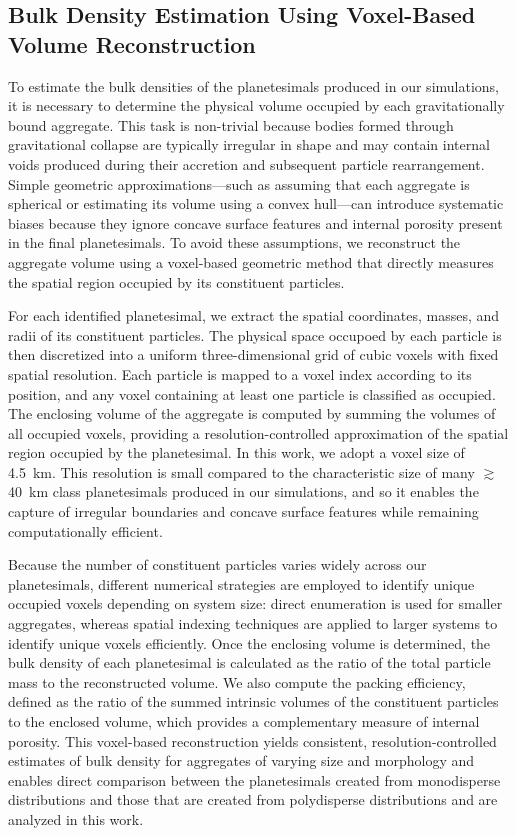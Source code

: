 \documentclass[fleqn,usenatbib]{mnras}
\begin{document}
\subsection{Bulk Density Estimation Using Voxel-Based Volume Reconstruction}\label{sec:bulk_density}
To estimate the bulk densities of the planetesimals produced in our simulations, it is necessary to determine the physical volume occupied by each gravitationally bound aggregate.
This task is non-trivial because bodies formed through gravitational collapse are typically irregular in shape and may contain internal voids produced during their accretion and subsequent particle rearrangement. 
Simple geometric approximations---such as assuming that each aggregate is spherical or estimating its volume using a convex hull---can introduce systematic biases because they ignore concave surface features and internal porosity present in the final planetesimals.
To avoid these assumptions, we reconstruct the aggregate volume using a voxel-based geometric method that directly measures the spatial region occupied by its constituent particles.

For each identified planetesimal, we extract the spatial coordinates, masses, and radii of its constituent particles.
The physical space occupoed by each particle is then discretized into a uniform three-dimensional grid of cubic voxels with fixed spatial resolution. 
Each particle is mapped to a voxel index according to its position, and any voxel containing at least one particle is classified as occupied. 
The enclosing volume of the aggregate is computed by summing the volumes of all occupied voxels, providing a resolution-controlled approximation of the spatial region occupied by the planetesimal.
In this work, we adopt a voxel size of 4.5~km. This resolution is small compared to the characteristic size of many $\gtrsim$40~km class planetesimals produced in our simulations, and so it enables the capture of irregular boundaries and concave surface features while remaining computationally efficient.

Because the number of constituent particles varies widely across our planetesimals, different numerical strategies are employed to identify unique occupied voxels depending on system size: direct enumeration is used for smaller aggregates, whereas spatial indexing techniques are applied to larger systems to identify unique voxels efficiently.
Once the enclosing volume is determined, the bulk density of each planetesimal is calculated as the ratio of the total particle mass to the reconstructed volume. 
We also compute the packing efficiency, defined as the ratio of the summed intrinsic volumes of the constituent particles to the enclosed volume, which provides a complementary measure of internal porosity.
This voxel-based reconstruction yields consistent, resolution-controlled estimates of bulk density for aggregates of varying size and morphology and enables direct comparison between the planetesimals created from monodisperse distributions \citep[i.e.,][]{Barnes2025} and those that are created from polydisperse  distributions and are analyzed in this work.
\end{document}
